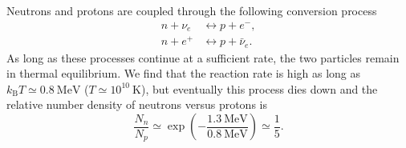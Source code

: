 \documentclass[a4paper,12pt]{article}
\theoremstyle{remark}
\newcommand{\mrm}[1]{\mathrm{#1}}
\renewcommand{\=}[1]{\stackrel{#1}{=}} %
\theoremstyle{plain}
\theoremstyle{definition}
\begin{document}
Neutrons and protons are coupled through the following conversion process
\begin{align}
n + \nu _e &\longleftrightarrow  p + e^-, \\
n + e^+ &\longleftrightarrow p + \bar{\nu}_e.
\end{align}
As long as these processes continue at a sufficient rate, the two particles remain in thermal equilibrium. We find that the reaction rate is high as long as $k_\mrm{B}T \simeq 0.8 \:\mrm{MeV}$ ($T\simeq10^{10}\:\mrm{K}$), but eventually this process dies down and the relative number density of neutrons versus protons is
\begin{equation}
\frac{N_n}{N_p} \simeq \exp \left( - \frac{1.3 \:\mrm{MeV}}{0.8 \:\mrm{MeV}} \right) \simeq \frac{1}{5}. 
\end{equation}


\begingroup
%
%

%
\linespread{0.5}\selectfont


\endgroup
\end{document}
